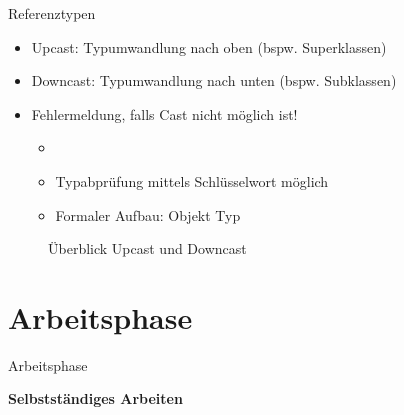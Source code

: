 \documentclass{../tuda-beamer}
\begin{document}
    \begin{frame}{Referenztypen}
        \begin{itemize}
            \item Upcast: Typumwandlung nach oben (bspw. Superklassen)
            \item Downcast: Typumwandlung nach unten (bspw. Subklassen)
            \item Fehlermeldung, falls Cast nicht möglich ist!
            \begin{itemize}
                \item {}
                \item Typabprüfung mittels Schlüsselwort  möglich
                \item Formaler Aufbau: Objekt  Typ
            \end{itemize}
        \end{itemize}
        \begin{figure}[h]
            \centering
            \caption{Überblick Upcast und Downcast}
        \end{figure}
    \end{frame}


    \section{Arbeitsphase}
    \begin{frame}[c]{Arbeitsphase}
        \begin{center}
            \textbf{\LARGE Selbstständiges Arbeiten}
        \end{center}
    \end{frame}
\end{document}
